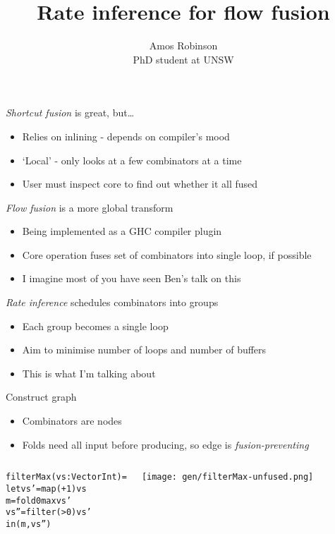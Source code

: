 \documentclass{beamer}
\newcommand{\bl}[1]{\textcolor[rgb]{0.0,0.5,0.9}{#1}}
\newcommand{\g}[1]{\textcolor[rgb]{0.7,0.3,0.3}{#1}}
\begin{document}
\title{Rate inference for flow fusion}
\author{Amos Robinson\\PhD student at UNSW}

\frame{\titlepage}

\begin{frame}[fragile]{\emph{Shortcut fusion} is great, but\ldots}
\begin{itemize}
\item Relies on inlining - depends on compiler's mood
\item `Local' - only looks at a few combinators at a time
\item User must inspect core to find out whether it all fused
\end{itemize}
\end{frame}


\begin{frame}[fragile]{\emph{Flow fusion} is a more global transform}
\begin{itemize}
\item Being implemented as a GHC compiler plugin
\item Core operation fuses set of combinators into single loop, if possible
\item I imagine most of you have seen Ben's talk on this
\end{itemize}
\end{frame}


\begin{frame}{\emph{Rate inference} schedules combinators into groups}
\begin{itemize}
\item Each group becomes a single loop
\item Aim to minimise number of loops and number of buffers
\item This is what I'm talking about
\end{itemize}
\end{frame}


\begin{frame}[fragile,b]{Construct graph}
\begin{itemize}
\item Combinators are nodes
\item Folds need all input before producing, so edge is \emph{fusion-preventing}
\end{itemize}

\begin{columns}
\column[t]{5cm}

\begin{alltt}\small
filterMax (\bl{vs} : Vector Int) =
 let vs' = \g{map}    (+1)    vs
     m   = \g{fold}     0 max vs'
     vs''= \g{filter} (>0)    vs'
 in (\bl{m}, \bl{vs''})
\end{alltt}

\column[t]{5cm}

\texttt{[image: gen/filterMax-unfused.png]}

\end{columns}
\end{frame}
\end{document}
